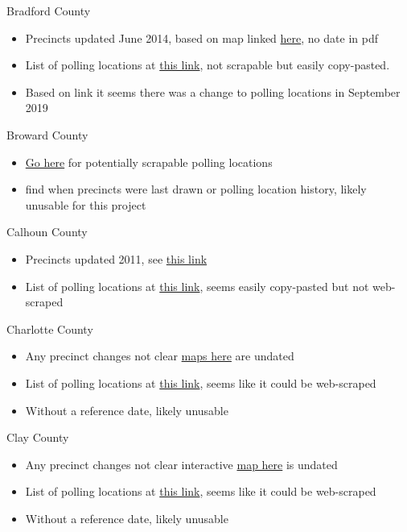 \documentclass[12pt]{article}
\begin{document}
Bradford County
\begin{itemize}
  \item Precincts updated June 2014, based on map linked \href{https://www.bradfordelections.com/Portals/Bradford/Documents/precinct_map.pdf?ver=2014-06-25-110922-550}{here}, no date in pdf
  \item List of polling locations at \href{https://www.bradfordelections.com/Portals/Bradford/Documents/Bradford%20Polling%20Locations%20with%20Address.pdf?ver=2019-09-26-161907-300}{this link}, not scrapable but easily copy-pasted.
  \item Based on link it seems there was a change to polling locations in September 2019
\end{itemize}
Broward County
\begin{itemize}
  \item \href{https://www.voterfocus.com/PrecinctFinder/precinctDirectory?county=FL-BRO}{Go here} for potentially scrapable polling locations
  \item find when precincts were last drawn or polling location history, likely unusable for this project
\end{itemize}
Calhoun County
\begin{itemize}
  \item Precincts updated 2011, see \href{https://www.votecalhoun.com/portals/calhoun/documents/calhouncountyprecinctmap2011.pdf}{this link}
  \item List of polling locations at \href{https://www.votecalhoun.com/Voter-Information/Polling-Place-Locations}{this link},  seems easily copy-pasted but not web-scraped
\end{itemize}
Charlotte County
\begin{itemize}
  \item Any precinct changes not clear \href{https://www.charlottevotes.com/Maps/Precinct-Maps}{maps here} are undated
  \item List of polling locations at \href{https://www.voterfocus.com/PrecinctFinder/precinctDirectory?county=FL-CHA}{this link},  seems like it could be web-scraped
  \item Without a reference date, likely unusable
\end{itemize}
Clay County
\begin{itemize}
  \item Any precinct changes not clear interactive \href{https://www.clayelections.gov/General-Information/Voter-Information-Map}{map here} is undated
  \item List of polling locations at \href{https://www.clayelections.gov/Election-Information/Polling-Locations}{this link},  seems like it could be web-scraped
  \item Without a reference date, likely unusable
\end{itemize}
\end{document}
